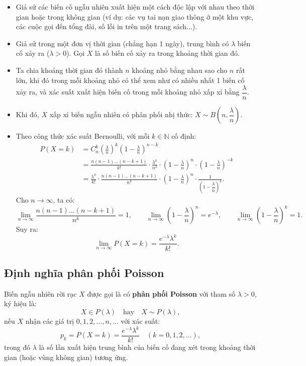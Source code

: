 \begin{itemize}
    \item Giả sử các biến cố ngẫu nhiên xuất hiện một cách độc lập với nhau theo thời gian hoặc trong không gian (ví dụ: các vụ tai nạn giao thông ở một khu vực, các cuộc gọi đến tổng đài, số lỗi in trên một trang sách...).
    \item Giả sử trong một đơn vị thời gian (chẳng hạn 1 ngày), trung bình có $\lambda$ biến cố xảy ra ($\lambda > 0$). Gọi $X$ là số biến cố xảy ra trong khoảng thời gian đó.
    \item Ta chia khoảng thời gian đó thành $n$ khoảng nhỏ bằng nhau sao cho $n$ rất lớn, khi đó trong mỗi khoảng nhỏ có thể xem như có nhiều nhất 1 biến cố xảy ra, và xác suất xuất hiện biến cố trong mỗi khoảng nhỏ xấp xỉ bằng $\dfrac{\lambda}{n}$.
    \item Khi đó, $X$ xấp xỉ biến ngẫu nhiên có phân phối nhị thức: $X \sim B\left(n, \dfrac{\lambda}{n}\right)$.
    \item Theo công thức xác suất Bernoulli, với mỗi $k \in \mathbb{N}$ cố định:
    \begin{align*}
    P(X = k) &= C_n^k \left(\frac{\lambda}{n}\right)^k \left(1 - \frac{\lambda}{n}\right)^{n - k} \\
    &= \frac{n(n - 1)\dots(n - k + 1)}{k!} \cdot \frac{\lambda^k}{n^k} \cdot \left(1 - \frac{\lambda}{n}\right)^n \cdot \left(1 - \frac{\lambda}{n}\right)^{-k} \\
    &= \frac{\lambda^k}{k!} \cdot \frac{n(n - 1)\dots(n - k + 1)}{n^k} \cdot \left(1 - \frac{\lambda}{n}\right)^n \cdot \frac{1}{\left(1 - \dfrac{\lambda}{n}\right)^k}.
    \end{align*}
    Cho $n \to \infty$, ta có:
    \[
    \lim_{n \to \infty} \frac{n(n - 1)\dots(n - k + 1)}{n^k} = 1, \qquad \lim_{n \to \infty} \left(1 - \frac{\lambda}{n}\right)^n = e^{-\lambda}, \qquad \lim_{n \to \infty} \left(1 - \frac{\lambda}{n}\right)^k = 1.
    \]
    Suy ra:
    \[
    \lim_{n \to \infty} P(X = k) = \frac{e^{-\lambda} \lambda^k}{k!}.
    \]
\end{itemize}

\subsection{Định nghĩa phân phối Poisson}

\begin{dinhnghia}
Biến ngẫu nhiên rời rạc $X$ được gọi là có \textbf{phân phối Poisson} với tham số $\lambda > 0$, ký hiệu là:
\[
X \in P(\lambda) \quad \text{hay} \quad X \sim P(\lambda),
\]
nếu $X$ nhận các giá trị $0, 1, 2, \dots, n, \dots$ với xác suất:
\[
p_k = P(X = k) = \frac{e^{-\lambda} \lambda^k}{k!} \quad (k = 0, 1, 2, \dots),
\]
trong đó $\lambda$ là số lần xuất hiện trung bình của biến cố đang xét trong khoảng thời gian (hoặc vùng không gian) tương ứng.
\end{dinhnghia}

